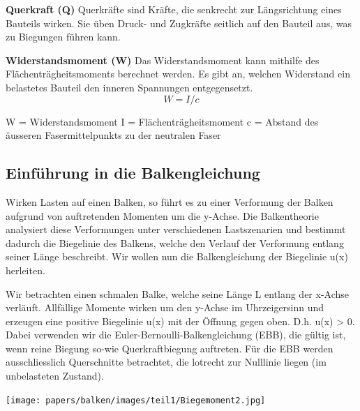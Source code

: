 \textbf{Querkraft (Q)}
Querkräfte sind Kräfte, die senkrecht zur Längsrichtung eines Bauteils wirken.
Sie üben Druck- und Zugkräfte seitlich auf den Bauteil aus, was zu Biegungen führen kann.

\textbf{Widerstandsmoment (W)}
Das Widerstandsmoment kann mithilfe des Flächenträgheitsmoments berechnet werden.
Es gibt an, welchen Widerstand ein belastetes Bauteil den inneren Spannungen entgegensetzt.
\begin{equation}
	W=
	I/c
\end{equation}
\label{Formel für den Widerstandsmoment.}

W = Widerstandsmoment
I = Flächenträgheitsmoment
c = Abstand des äusseren Fasermittelpunkts zu der neutralen Faser

\subsection{Einführung in die Balkengleichung}
Wirken Lasten auf einen Balken, so führt es zu einer Verformung der Balken aufgrund von auftretenden Momenten um die y-Achse.
Die Balkentheorie analysiert diese Verformungen unter verschiedenen Lastszenarien und bestimmt dadurch die Biegelinie des Balkens, welche den Verlauf der Verformung entlang seiner Länge beschreibt.
Wir wollen nun die Balkengleichung der Biegelinie u(x) herleiten.

Wir betrachten einen schmalen Balke, welche seine Länge L entlang der x-Achse verläuft.
Allfällige Momente wirken um den y-Achse im Uhrzeigersinn und erzeugen eine positive Biegelinie u(x) mit der Öffnung gegen oben.
D.h. u(x) > 0.
Dabei verwenden wir die Euler-Bernoulli-Balkengleichung (EBB), die gültig ist, wenn reine Biegung so-wie Querkraftbiegung auftreten.
Für die EBB werden ausschliesslich Querschnitte betrachtet, die lotrecht zur Nulllinie liegen (im unbelasteten Zustand).
\begin{center}
	\texttt{[image: papers/balken/images/teil1/Biegemoment2.jpg]}
\end{center}
\label{Die Abbildung zeigt einen belasteten Balken und die resultierende Biegelinie u(x).}